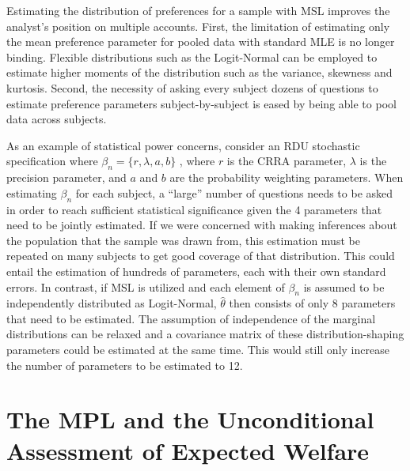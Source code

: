 \documentclass[../main.tex]{subfiles}
\begin{document}
Estimating the distribution of preferences for a sample with MSL improves the analyst's position on multiple accounts.
First, the limitation of estimating only the mean preference parameter for pooled data with standard MLE is no longer binding.
Flexible distributions such as the Logit-Normal{\footnotemark} can be employed to estimate higher moments of the distribution such as the variance, skewness and kurtosis.
Second, the necessity of asking every subject dozens of questions to estimate preference parameters subject-by-subject is eased by being able to pool data across subjects.

\addtocounter{footnote}{-1}

As an example of statistical power concerns, consider an RDU stochastic specification where $\beta_n =\{r , \lambda , a , b\}$ , where $r$ is the CRRA parameter, $\lambda$ is the precision parameter, and $a$ and $b$ are the probability weighting parameters.
When estimating $\beta_n$ for each subject, a \enquote{large} number of questions needs to be asked in order to reach sufficient statistical significance given the 4 parameters that need to be jointly estimated.
If we were concerned with making inferences about the population that the sample was drawn from, this estimation must be repeated on many subjects to get good coverage of that distribution.
This could entail the estimation of hundreds of parameters, each with their own standard errors.
In contrast, if MSL is utilized and each element of $\beta_n$ is assumed to be independently distributed as Logit-Normal, $\hat{\theta}$ then consists of only 8 parameters that need to be estimated.
The assumption of independence of the marginal distributions can be relaxed and a covariance matrix of these distribution-shaping parameters could be estimated at the same time.
This would still only increase the number of parameters to be estimated to 12.

\section{The \texorpdfstring{\textcite{Holt2002}}{Holt and Laury (2002)} MPL and the Unconditional Assessment of Expected Welfare}
\end{document}
